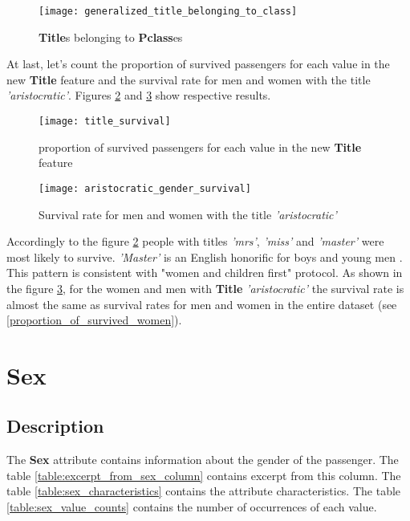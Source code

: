 \begin{figure}[!hp]
    \centering
    \texttt{[image: generalized\_title\_belonging\_to\_class]}
    \caption{\textbf{Title}s belonging to \textbf{Pclass}es}
    \label{pic:generalized_title_belonging_to_class}
\end{figure}

At last, let's count the proportion of survived passengers for each value
in the new \textbf{Title} feature and the survival rate for men and women
with the title \textit{'aristocratic'}. Figures \ref{pic:title_survival}
and \ref{pic:aristocratic_gender_survival} show respective results.

\begin{figure}[!hp]
    \centering
    \texttt{[image: title\_survival]}
    \caption{proportion of survived passengers for each value in the new
             \textbf{Title} feature}
    \label{pic:title_survival}
\end{figure}

\begin{figure}[!hp]
    \centering
    \texttt{[image: aristocratic\_gender\_survival]}
    \caption{Survival rate for men and women with the title 
             \textit{'aristocratic'}}
    \label{pic:aristocratic_gender_survival}
\end{figure}

Accordingly to the figure \ref{pic:title_survival} people with titles
\textit{'mrs'}, \textit{'miss'} and \textit{'master'} were most likely 
to survive. \textit{'Master'} is an English honorific for boys and young 
men \cite{english_honorics}. This pattern is consistent with "women and 
children first" protocol. As shown in the figure 
\ref{pic:aristocratic_gender_survival}, for the women and men with 
\textbf{Title} \textit{'aristocratic'} the survival rate is almost the 
same as survival rates for men and women in the entire dataset (see 
\ref{proportion_of_survived_women}).


\section{Sex} \label{section:Sex}
\subsection{Description}
The \textbf{Sex} attribute contains information about the gender of the 
passenger. The table \ref{table:excerpt_from_sex_column} contains excerpt 
from this column. The table \ref{table:sex_characteristics} contains the 
attribute characteristics. The table \ref{table:sex_value_counts} contains 
the number of occurrences of each value.


